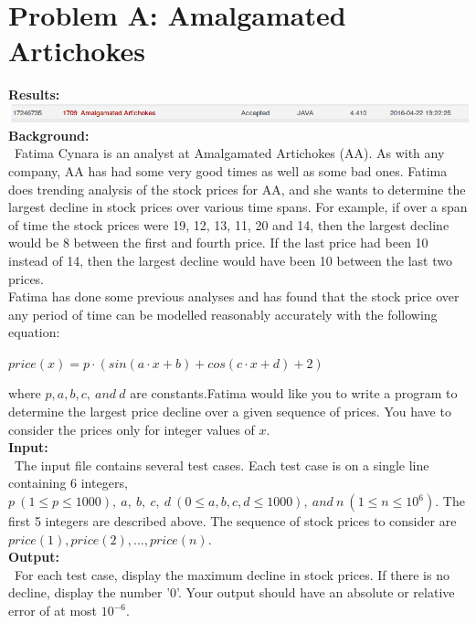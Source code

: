 \documentclass[12pt]{article}
\begin{document}

\section{Problem A: Amalgamated Artichokes}
\noindent \textbf{Results:} \\

\includegraphics[width=\textwidth]{ProblemA} \\

\noindent \textbf{Background:} \\
~\indent Fatima Cynara is an analyst at Amalgamated Artichokes (AA). As with any company, AA has had some
very good times as well as some bad ones. Fatima does trending analysis of the stock prices for AA, and she
wants to determine the largest decline in stock prices over various time spans. For example, if over a span
of time the stock prices were 19, 12, 13, 11, 20 and 14, then the largest decline would be 8 between the first
and fourth price. If the last price had been 10 instead of 14, then the largest decline would have been 10
between the last two prices. \\
\indent Fatima has done some previous analyses and has found that the stock price over any period of time can
be modelled reasonably accurately with the following equation:
\begin{center}$price(x) = p \cdot (sin(a\cdot x + b) + cos(c\cdot x + d) + 2)$\end{center}
where $p,a,b,c,\ and\ d$ are constants.Fatima would like you to write a program to determine the largest
price decline over a given sequence of prices. You have to consider the prices only for integer values of $x$. \\

\noindent \textbf{Input:} \\
~\indent The input file contains several test cases. Each test case is on a single line containing 6 integers,
$p\ (1 \leq p \leq 1000),\ a,\ b,\ c,\ d\ (0 \leq a,b,c,d \leq 1000),\ and\ n\ (1 \leq n \leq 10^6)$. The first
5 integers are described above. The sequence of stock prices to consider are $price(1), price(2),..., price(n).$ \\

\noindent \textbf{Output:} \\
~\indent For each test case, display the maximum decline in stock prices. If there is no decline, display the
number '0'. Your output should have an absolute or relative error of at most $10^{-6}$. \\
\end{document}
